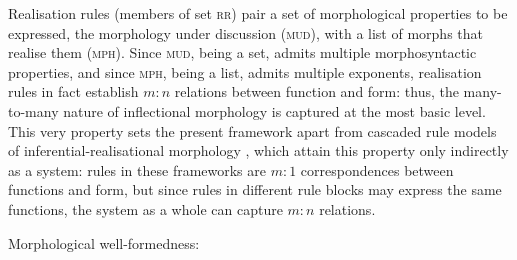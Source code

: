 \documentclass[output=paper
	        ,collection
	        ,collectionchapter
 	        ,biblatex
                ,babelshorthands
                ,newtxmath
                ,draftmode
                ,colorlinks, citecolor=brown
]{langscibook}
\begin{document}
\begin{exe}
\begin{xlist}
\begin{exe}
  \ex \label{ex:MudMS}

\end{exe}

Realisation rules (members of set \textsc{rr}) pair a set of
morphological properties to be expressed, the morphology under
discussion (\textsc{mud}), with a list of morphs that realise them
(\textsc{mph}). Since \textsc{mud}, being a set, admits multiple
morphosyntactic properties, and since \textsc{mph}, being a list,
admits multiple exponents, realisation rules in fact establish $m:n$
relations between function and form: thus, the many-to-many nature of
inflectional morphology is captured at the most basic level. This very
property sets the present framework apart from cascaded rule models of
inferential-realisational morphology \citep{Anderson92,Stump01}, which
attain this property only indirectly as a system: rules in these
frameworks are $m:1$ correspondences between functions and form, but
since rules in different rule blocks may express the same functions,
the system as a whole can capture $m:n$ relations.

\ea
\label{ex-MCC}
Morphological well-formedness:\\
\z


\end{xlist}
\end{exe}
\end{document}
